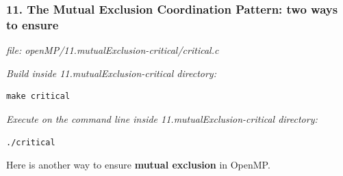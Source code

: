 \documentclass[letterpaper,10pt,openany,oneside]{sphinxmanual}
\begin{document}
\subsubsection{11. The Mutual Exclusion Coordination Pattern: two ways to ensure}
\label{SharedMemory/MutualExclusion:the-mutual-exclusion-coordination-pattern-two-ways-to-ensure}
\emph{file: openMP/11.mutualExclusion-critical/critical.c}

\emph{Build inside 11.mutualExclusion-critical directory:}

\begin{Verbatim}[commandchars=\\\{\}]
make critical
\end{Verbatim}

\emph{Execute on the command line inside 11.mutualExclusion-critical directory:}

\begin{Verbatim}[commandchars=\\\{\}]
./critical
\end{Verbatim}

Here is another way to ensure \textbf{mutual exclusion} in OpenMP.
\end{document}
